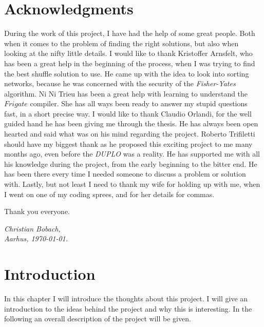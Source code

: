\documentclass[twoside,11pt,openright]{report}
\newcommand{\FY}{\textit{Fisher-Yates} }
\newcommand{\DUPLO}{\textit{DUPLO} }
\begin{document}
\chapter*{Acknowledgments}
During the work of this project, I have had the help of some great people. Both when it comes to the problem of finding the right solutions, but also when looking at the nifty little details. I would like to thank Kristoffer Arnsfelt, who has been a great help in the beginning of the process, when I was trying to find the best shuffle solution to use. He came up with the idea to look into sorting networks, because he was concerned with the security of the \FY algorithm. Ni Ni Trieu has been a great help with learning to understand the $Frigate$ compiler. She has all ways been ready to answer my stupid questions fast, in a short precise way. I would like to thank Claudio Orlandi, for the well guided hand he has been giving me through the thesis. He has always been open hearted and said what was on his mind regarding the project. Roberto Trifiletti should have my biggest thank as he proposed this exciting project to me many months ago, even before the \DUPLO was a reality. He has supported me with all his knowledge during the project, from the early beginning to the bitter end. He has been there every time I needed someone to discuss a problem or solution with. Lastly, but not least I need to thank my wife for holding up with me, when I went on one of my coding sprees, and for her details for commas.

Thank you everyone.

\vspace{2ex}
\begin{flushright}
  \emph{Christian Bobach,}\\
  \emph{Aarhus, \today.}
\end{flushright}

\changepage{-35mm}{}{}{}{}{}{}{}{}
\tableofcontents
{}
\setcounter{secnumdepth}{2}

\chapter{Introduction}
\label{ch:intro}

In this chapter I will introduce the thoughts about this project. I will give an introduction to the ideas behind the project and why this is interesting. In the following an overall description of the project will be given.
\end{document}
